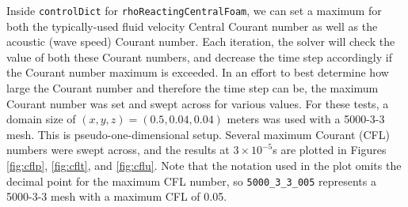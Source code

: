 Inside \verb|controlDict| for \verb|rhoReactingCentralFoam|, we can set a maximum for both the typically-used fluid velocity Central Courant number as well as the acoustic (wave speed) Courant number. Each iteration, the solver will check the value of both these Courant numbers, and decrease the time step accordingly if the Courant number maximum is exceeded. In an effort to best determine how large the Courant number and therefore the time step can be, the maximum Courant number was set and swept across for various values. For these tests, a domain size of \( (x,y,z) = (0.5,0.04,0.04) \) meters was used with a 5000-3-3 mesh. This is pseudo-one-dimensional setup. Several maximum Courant (CFL) \cite{courant} numbers were swept across, and the results at \(3\times 10^{ - 5}\)s are plotted in Figures \ref{fig:cflp}, \ref{fig:cflt}, and \ref{fig:cflu}. Note that the notation used in the plot omits the decimal point for the maximum CFL number, so \verb|5000_3_3_005| represents a 5000-3-3 mesh with a maximum CFL of 0.05. 

